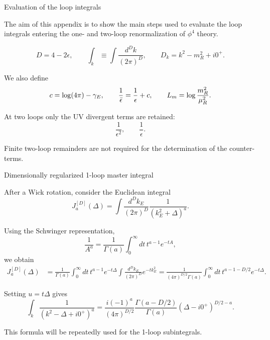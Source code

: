 \documentclass[aspectratio=169,10pt]{beamer}
\begin{document}
\begin{frame}{Evaluation of the loop integrals}

The aim of this appendix is to show the main steps used to evaluate
the loop integrals entering the one- and two-loop renormalization
of $\phi^4$ theory.

\begin{equation}
D=4-2\epsilon,
\qquad
\int_k \equiv \int\frac{d^Dk}{(2\pi)^D},
\qquad
D_k=k^2-m_R^2+i0^+ .
\end{equation}

We also define
\begin{equation}
c=\log(4\pi)-\gamma_E,
\qquad
\frac1{\bar\epsilon}
=
\frac1\epsilon+c,
\qquad
L_m=\log\frac{m_R^2}{\mu_R^2}.
\end{equation}

At two loops only the UV divergent terms are retained:
\begin{equation}
\frac1{\epsilon^2},
\qquad
\frac1{\epsilon}.
\end{equation}

Finite two-loop remainders are not required for the determination
of the counter-terms.


\end{frame}


\begin{frame}{Dimensionally regularized 1-loop master integral}

After a Wick rotation, consider the Euclidean integral
\begin{equation}
J_a^{[D]}(\Delta)
=
\int\frac{d^Dk_E}{(2\pi)^D}
\frac1{(k_E^2+\Delta)^a}.
\end{equation}

Using the Schwinger representation,
\begin{equation}
\frac1{A^a}
=
\frac1{\Gamma(a)}
\int_0^\infty dt\,t^{a-1}e^{-tA},
\end{equation}
we obtain
\begin{align}
J_a^{[D]}(\Delta)
&=
\frac1{\Gamma(a)}
\int_0^\infty dt\,t^{a-1}e^{-t\Delta}
\int\frac{d^Dk_E}{(2\pi)^D}e^{-tk_E^2} =
\frac1{(4\pi)^{D/2}\Gamma(a)}
\int_0^\infty dt\,
t^{a-1-D/2}e^{-t\Delta}.
\end{align}

Setting $u=t\Delta$ gives
\begin{equation}
\int_k
\frac1{(k^2-\Delta+i0^+)^a}
=
\frac{i(-1)^a}{(4\pi)^{D/2}}
\frac{\Gamma(a-D/2)}{\Gamma(a)}
(\Delta-i0^+)^{D/2-a}.
\end{equation}

This formula will be repeatedly used for the 1-loop subintegrals.


\end{frame}
\end{document}
